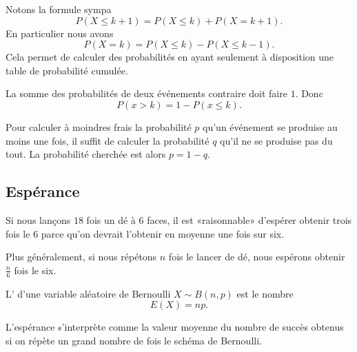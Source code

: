 Notons la formule sympa
\begin{equation}
    P(X\leq k+1)=P(X\leq k)+P(X=k+1).
\end{equation}
En particulier nous avons
\begin{equation}
    P(X=k)=P(X\leq k)-P(X\leq k-1).
\end{equation}
Cela permet de calculer des probabilités en ayant seulement à disposition une table de probabilité cumulée.

\begin{Aretenir}
     La somme des probabilités de deux événements contraire doit faire \( 1\). Donc
    \begin{equation}
        P(x>k)=1-P(x\leq k).
    \end{equation}
\end{Aretenir}

\begin{example}
    Pour calculer à moindres frais la probabilité \( p\) qu'un événement se produise au moins une fois, il suffit de calculer la probabilité \( q\) qu'il ne se produise pas du tout. La probabilité cherchée est alors \( p=1-q\).
\end{example}

\subsection{Espérance}

\begin{example}
    Si nous lançons \( 18\) fois un dé à \( 6\) faces, il est «raisonnable» d'espérer obtenir trois fois le \( 6\) parce qu'on devrait l'obtenir en moyenne une fois sur six.
\end{example}
Plus généralement, si nous répétons \( n\) fois le lancer de dé, nous espérons obtenir \( \frac{ n }{ 6 }\) fois le six.

\begin{definition}
    L' d'une variable aléatoire de Bernoulli \( X\sim B(n,p)\) est le nombre
    \begin{equation}
        E(X)=np.
    \end{equation}
\end{definition}
\begin{Aretenir}
    L'espérance s'interprète comme la valeur moyenne du nombre de succès obtenus si on répète un grand nombre de fois le schéma de Bernoulli.
\end{Aretenir}

